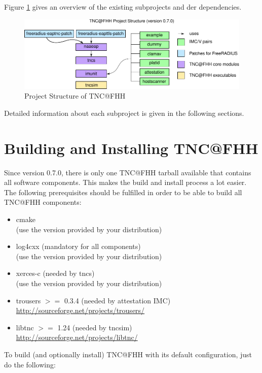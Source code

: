 \documentclass[a4paper,10pt]{scrartcl}
\begin{document}
Figure \ref{fig:tncfhh-project-structure} gives an overview of the existing subprojects and der dependencies.
\begin{figure}
 \centering
   \includegraphics[width=\textwidth,height=!]{figures/tncfhh-project-structure-0-7-0.pdf}
 \caption{Project Structure of TNC@FHH}
 \label{fig:tncfhh-project-structure}
\end{figure}

Detailed information about each subproject is given in the following sections.

\section{Building and Installing TNC@FHH}
Since version 0.7.0, there is only one TNC@FHH tarball available that contains all
software components. This makes the build and install process a lot easier. The
following prerequisites should be fulfilled in order to be able to build all TNC@FHH components:
\begin{itemize}
    \item cmake\\
	(use the version provided by your distribution)
    \item log4cxx (mandatory for all components)\\
	(use the version provided by your distribution)
	\item xerces-c (needed by tncs)\\
	(use the version provided by your distribution)
	\item trousers $>=$ 0.3.4 (needed by attestation IMC)\\ \url{http://sourceforge.net/projects/trousers/}
	\item libtnc $>=$ 1.24 (needed by tncsim)\\ \url{http://sourceforge.net/projects/libtnc/}
\end{itemize}

To build (and optionally install) TNC@FHH with its default configuration, just do the following:
\end{document}
